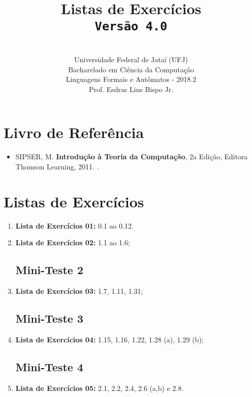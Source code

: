 \documentclass[12pt,a4paper,oneside]{article}
\author{\\Universidade Federal de Jataí (UFJ)\\Bacharelado em Ciência da Computação \\Linguagens Formais e Autômatos - 2018.2 \\Prof. Esdras Lins Bispo Jr.}
\date{}
\title{
	\sc \huge Listas de Exercícios
	\\{\tt Versão 4.0}
}
\begin{document}
\maketitle

\section{Livro de Referência}
	\begin{itemize}
		\item SIPSER, M. {\bf Introdução à Teoria da Computação}, 2a Edição, Editora Thomson Learning, 2011. \color{blue}{\bf Código Bib.: [004 SIP/int]}.
	\end{itemize}
	
\section{Listas de Exercícios}

\begin{enumerate}

	\subsection{Mini-Teste 1}
	\item[] {\bf Lista de Exercícios 01:} 0.1 ao 0.12.
	\item[] {\bf Lista de Exercícios 02:} 1.1 ao 1.6;
	
	\subsection{Mini-Teste 2}
	\item[] {\bf Lista de Exercícios 03:} 1.7, 1.11, 1.31;
	
	\subsection{Mini-Teste 3}
	\item[] {\bf Lista de Exercícios 04:} 1.15, 1.16, 1.22, 1.28 (a), 1.29 (b);
	
	\subsection{Mini-Teste 4}
	\item[] {\bf Lista de Exercícios 05:} 2.1, 2.2, 2.4, 2.6 (a,b) e 2.8.
	
\end{enumerate}
\end{document}
